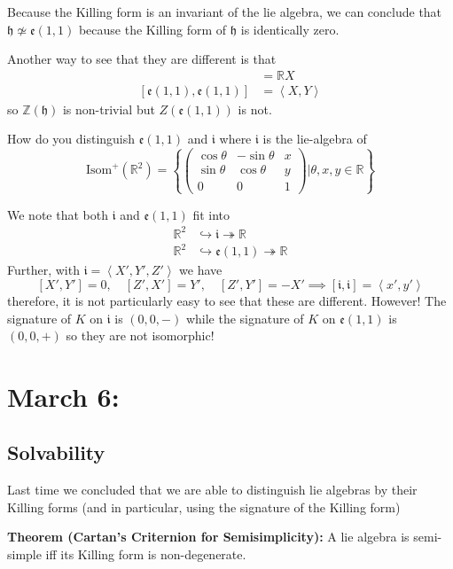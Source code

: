 \documentclass[12pt]{article}
\newcommand{\R}{\mathbb{R}}
\newcommand{\Z}{\mathbb{Z}}
\newcommand{\brak}[1]{\left\langle #1 \right\rangle}
\newcommand{\h}{\mathfrak{h}}
\newcommand{\Isom}{\text{Isom}}
\begin{document}
    Because the Killing form is an invariant of the lie algebra, we can conclude that $\h \not\simeq \mathfrak{e}(1, 1)$ because the Killing form of $\h$ is identically zero.

    Another way to see that they are different is that 
    \begin{align*}
        [\h, \h] &= \R X\\ 
        [\mathfrak{e}(1, 1), \mathfrak{e}(1, 1)] &= \brak{X, Y}
    \end{align*}
    so $\Z(\h)$ is non-trivial but $Z(\mathfrak{e}(1, 1))$ is not. 

    How do you distinguish $\mathfrak{e}(1, 1)$ and $\mathfrak{i}$ where $\mathfrak{i}$ is the lie-algebra of 
    \[\Isom^+(\R^2) = \left\{\begin{pmatrix}
        \cos \theta & -\sin \theta & x\\ 
        \sin \theta & \cos \theta & y\\
        0 & 0 & 1
    \end{pmatrix} \bigg\vert \theta, x, y \in \R\right\}\]

    We note that both $\mathfrak{i}$ and $\mathfrak{e}(1, 1)$ fit into 
    \begin{align*}
        \R^2 &\hookrightarrow \mathfrak{i} \twoheadrightarrow \R\\ 
        \R^2 &\hookrightarrow \mathfrak{e}(1, 1) \twoheadrightarrow \R
    \end{align*}
    Further, with $\mathfrak{i} = \brak{X', Y', Z'}$ we have 
    \[[X', Y'] = 0, \quad [Z', X'] = Y', \quad [Z', Y'] = -X' \implies [\mathfrak{i}, \mathfrak{i}] = \brak{x', y'}\]
    therefore, it is not particularly easy to see that these are different. However! The signature of $K$ on $\mathfrak{i}$ is $(0, 0, -)$ while the signature of $K$ on $\mathfrak{e}(1, 1)$ is $(0, 0, +)$ so they are not isomorphic! 

\section{March 6:}
\subsection*{Solvability}
    Last time we concluded that we are able to distinguish lie algebras by their Killing forms (and in particular, using the signature of the Killing form)

    \textbf{Theorem (Cartan's Criternion for Semisimplicity):} A lie algebra is semi-simple iff its Killing form is non-degenerate.
    
\end{document}

